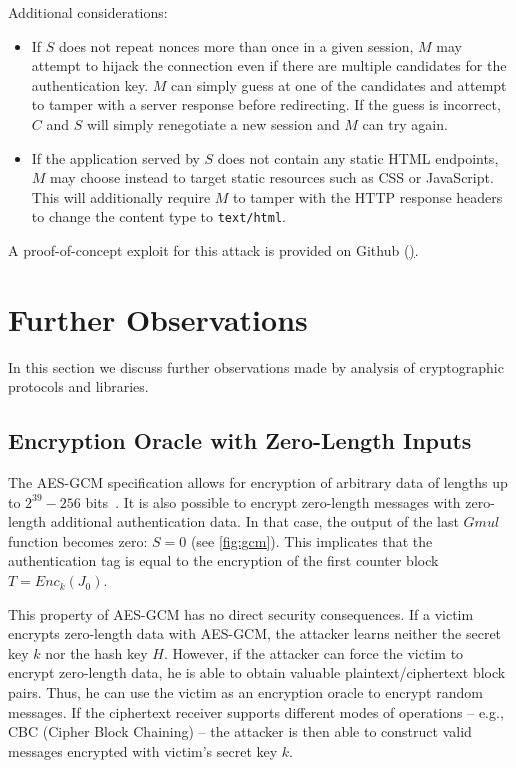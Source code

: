 \documentclass[10pt, a4paper]{article}
\begin{document}
Additional considerations:

\begin{itemize}

\item If $S$ does not repeat nonces more than once in a given session, $M$ may attempt to hijack the connection even if there are multiple candidates for the authentication key. $M$ can simply guess at one of the candidates and attempt to tamper with a server response before redirecting. If the guess is incorrect, $C$ and $S$ will simply renegotiate a new session and $M$ can try again.

\item If the application served by $S$ does not contain any static HTML endpoints, $M$ may choose instead to target static resources such as CSS or JavaScript. This will additionally require $M$ to tamper with the HTTP response headers to change the content type to \texttt{text/html}.

\end{itemize}

A proof-of-concept exploit for this attack is provided on Github (\href{https://github.com/nonce-disrespect/nonce-disrespect/}).

\section{Further Observations}
In this section we discuss further observations made by analysis of cryptographic protocols and libraries.

\subsection{Encryption Oracle with Zero-Length Inputs}
The AES-GCM specification allows for encryption of arbitrary data of lengths up to $2^{39}-256$ bits~\cite{gcm}.
It is also possible to encrypt zero-length messages with zero-length additional authentication data. In that case, the output of the last $Gmul$
function becomes zero: $S=0$ (see \cref{fig:gcm}). This implicates that the authentication tag is equal to the encryption of the first counter block $T = Enc_k(J_0)$.

This property of AES-GCM has no direct security consequences. If a victim encrypts zero-length data with AES-GCM, the attacker learns neither the secret key $k$ nor the
hash key $H$. However, if the attacker can force the victim to encrypt zero-length data, he is able to obtain valuable plaintext/ciphertext block pairs.
Thus, he can use the victim as an encryption oracle to encrypt random messages.
If the ciphertext receiver supports different modes of operations -- e.g., CBC (Cipher Block Chaining) -- the attacker is then able to construct valid messages encrypted with victim's
secret key $k$.
\end{document}
